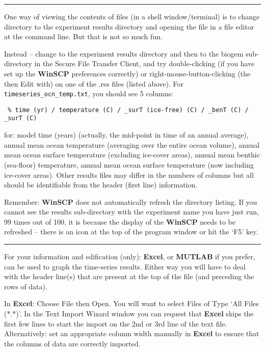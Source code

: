 \vspace{1mm}\noindent\rule{4cm}{0.1mm}\vspace{2mm}

\noindent One way of viewing the contents of files (in a shell window/terminal) is to change directory to the experiment results directory and opening the file in a file editor at the command line. But that is not so much fun.

Instead – change to the experiment results directory and then to the \textsf{\footnotesize biogem} sub-directory in the Secure File Transfer Client, and try double-clicking (if you have set up the \textbf{WinSCP} preferences correctly) or right-mouse-button-clicking (the then Edit with) on one of the .res files (listed above).
\vspace{1mm}
For \texttt{timeseries\_ocn\_temp.txt}, you should see 5 columns:
\small\begin{verbatim}
 % time (yr) / temperature (C) / _surT (ice-free) (C) / _benT (C) / _surT (C)
\end{verbatim}\normalsize
for: model time (years) (actually, the mid-point in time of an annual average), annual mean ocean temperature (averaging over the entire ocean volume), annual mean ocean surface temperature (excluding ice-cover areas), annual mean benthic (sea-floor) temperature, annual mean ocean surface temperature (now including ice-cover areas). Other results files may differ in the numbers of columns but all should be identifiable from the header (first line) information.

Remember: \textbf{WinSCP} does not automatically refresh the directory listing. If you cannot see the results sub-directory with the experiment name you have just run, 99 times out of 100, it is because the display of the \textbf{WinSCP} needs to be refreshed -- there is an icon at the top of the program window or hit the ‘\textsf{\footnotesize F5}’ key.

\vspace{1mm}
\noindent\rule{4cm}{0.1mm}
\vspace{2mm}

\noindent For your information and edification (only): \textbf{Excel}, or \textbf{MUTLAB} if you prefer, can be used to graph the time-series results. Either way you will have to deal with the header line(s) that are present at the top of the file (and preceding the rows of data).

In \textbf{Excel}: Choose \textsf{\footnotesize File} then \textsf{\footnotesize Open}.  You will want to select \textsf{\footnotesize Files of Type} ‘\textsf{\footnotesize All Files (*.*)}’. In the \textsf{\footnotesize Text Import Wizard} window you can request that \textbf{Excel} skips the first few lines to start the import on the 2nd or 3rd line of the text file. Alternatively: set an appropriate column width manually in \textbf{Excel} to ensure that the columns of data are correctly imported.

